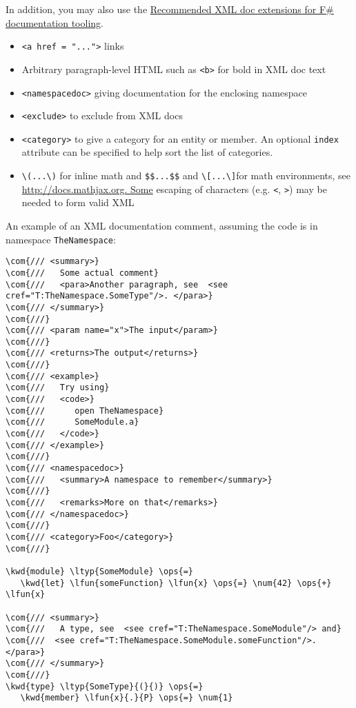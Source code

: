 \documentclass{article}
\newcommand{\com}[1]{\textcolor{officegreen}{#1}}
\newcommand{\kwd}[1]{\textcolor{navy}{#1}}
\newcommand{\num}[1]{\textcolor{officegreen}{#1}}
\newcommand{\ops}[1]{\textcolor{purple}{#1}}
\begin{document}
In addition, you may also use the \href{https://github.com/fsharp/fslang-design/blob/master/tooling/FST-1031-xmldoc-extensions.md}{Recommended XML doc extensions for F\# documentation tooling}.
\begin{itemize}
\item 

\texttt{<a href = "...">} links

\item 

Arbitrary paragraph-level HTML such as \texttt{<b>} for bold in XML doc text

\item 

\texttt{<namespacedoc>} giving documentation for the enclosing namespace

\item 

\texttt{<exclude>} to exclude from XML docs

\item 

\texttt{<category>} to give a category for an entity or member. An optional \texttt{index} attribute can be specified
to help sort the list of categories.

\item 

\texttt{{\textbackslash}(...{\textbackslash})} for inline math and \texttt{\$\$...\$\$} and \texttt{{\textbackslash}[...{\textbackslash}]}for math environments, see \href{http://docs.mathjax.org.
Some}{http://docs.mathjax.org.
Some} escaping of characters (e.g. \texttt{<}, \texttt{>}) may be needed to form valid XML

\end{itemize}



An example of an XML documentation comment, assuming the code is in namespace \texttt{TheNamespace}:
\begin{Verbatim}[commandchars=\\\{\}]
\com{/// <summary>}
\com{///   Some actual comment}
\com{///   <para>Another paragraph, see  <see cref="T:TheNamespace.SomeType"/>. </para>}
\com{/// </summary>}
\com{///}
\com{/// <param name="x">The input</param>}
\com{///}
\com{/// <returns>The output</returns>}
\com{///}
\com{/// <example>}
\com{///   Try using}
\com{///   <code>}
\com{///      open TheNamespace}
\com{///      SomeModule.a}
\com{///   </code>}
\com{/// </example>}
\com{///}
\com{/// <namespacedoc>}
\com{///   <summary>A namespace to remember</summary>}
\com{///}
\com{///   <remarks>More on that</remarks>}
\com{/// </namespacedoc>}
\com{///}
\com{/// <category>Foo</category>}
\com{///}

\kwd{module} \ltyp{SomeModule} \ops{=} 
   \kwd{let} \lfun{someFunction} \lfun{x} \ops{=} \num{42} \ops{+} \lfun{x}

\com{/// <summary>}
\com{///   A type, see  <see cref="T:TheNamespace.SomeModule"/> and}
\com{///  <see cref="T:TheNamespace.SomeModule.someFunction"/>. </para>}
\com{/// </summary>}
\com{///}
\kwd{type} \ltyp{SomeType}{(}{)} \ops{=}
   \kwd{member} \lfun{x}{.}{P} \ops{=} \num{1}
\end{Verbatim}
\end{document}
